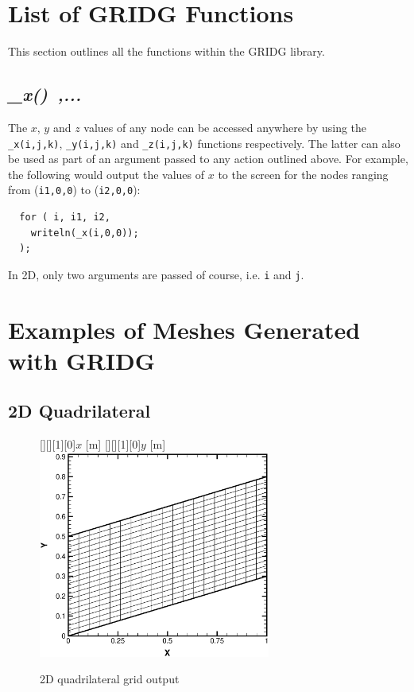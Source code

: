 \documentclass{warpdoc}
\newcommand{\fontxfig}{\footnotesize\scalefont{0.918}}
\begin{document}
\section{List of GRIDG Functions}

This section outlines all the functions within the GRIDG library. 

\subsection{\emph{\_x()~,...}}

The $x$, $y$ and $z$ values of any node can be accessed
anywhere by using the \verb|_x(i,j,k)|, \verb|_y(i,j,k)|
and \verb|_z(i,j,k)| functions respectively. The latter can
also be used  as part of an argument passed to any action outlined
above. For example, the following would output the values
of $x$ to the screen for the nodes ranging from (\verb|i1,0,0|)
to (\verb|i2,0,0|):
%
\begin{verbatim}
  for ( i, i1, i2,
    writeln(_x(i,0,0));
  );
\end{verbatim}
%
In 2D, only two arguments are passed of course, i.e. \verb|i|
and \verb|j|.



\section{Examples of Meshes Generated with GRIDG}


\subsection{2D Quadrilateral}


%
\begin{figure}[h]
\vspace{0.3cm}
   \fontxfig
   [][][1][0]{$x$ [m]}
   [][][1][0]{$y$ [m]}
   \includegraphics[width=3.0in]{grid.2D.quad.eps}
\caption{2D quadrilateral grid output}
\label{fig:gridquad}
\end{figure}
%
\end{document}
